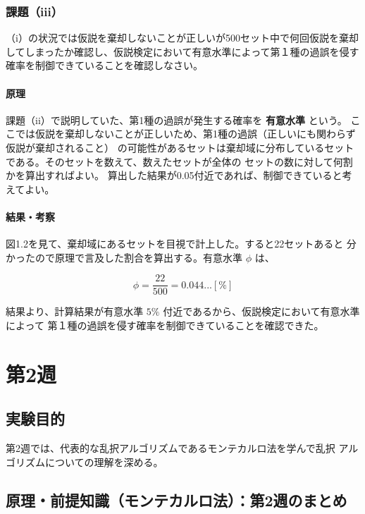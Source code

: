 \documentclass[10pt,a4paper,titlepage]{jreport} %
\begin{document}
\subsection{課題（iii）}

（i）の状況では仮説を棄却しないことが正しいが500セット中で何回仮説を棄却
してしまったか確認し、仮説検定において有意水準によって第１種の過誤を侵す
確率を制御できていることを確認しなさい。

\subsubsection{原理}

課題（ii）で説明していた、第1種の過誤が発生する確率を \textbf{有意水準} という。
ここでは仮説を棄却しないことが正しいため、第1種の過誤（正しいにも関わらず仮説が棄却されること）
の可能性があるセットは棄却域に分布しているセットである。そのセットを数えて、数えたセットが全体の
セットの数に対して何割かを算出すればよい。
算出した結果が0.05付近であれば、制御できていると考えてよい。

\subsubsection{結果・考察}

図1.2を見て、棄却域にあるセットを目視で計上した。すると22セットあると
分かったので原理で言及した割合を算出する。有意水準 $\phi$ は、

\begin{equation}
\phi = \frac{22}{500} = 0.044...[\%]
\end{equation}

結果より、計算結果が有意水準 $5\%$ 付近であるから、仮説検定において有意水準によって
第１種の過誤を侵す確率を制御できていることを確認できた。


\chapter{第2週}

\section{実験目的}

第2週では、代表的な乱択アルゴリズムであるモンテカルロ法を学んで乱択
アルゴリズムについての理解を深める。

\section{原理・前提知識（モンテカルロ法）：第2週のまとめ}
\end{document}
